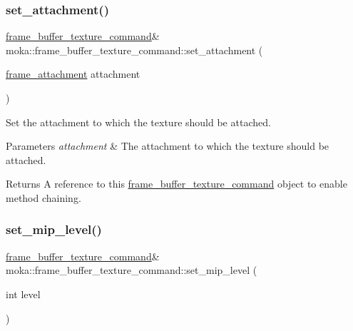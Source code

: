 \mbox{\label{classmoka_1_1frame__buffer__texture__command_a6ae9bc7d6a29e0dac6bd13b69d5b6b5e}} 
\subsubsection{\texorpdfstring{set\_attachment()}{set\_attachment()}}
{\footnotesize\ttfamily \mbox{\hyperlink{classmoka_1_1frame__buffer__texture__command}{frame\+\_\+buffer\+\_\+texture\+\_\+command}}\& moka\+::frame\+\_\+buffer\+\_\+texture\+\_\+command\+::set\+\_\+attachment (\begin{DoxyParamCaption}\item[{\mbox{\hyperlink{namespacemoka_a0a44ecbb877dec1107d9915dc95c58d1}{frame\+\_\+attachment}}}]{attachment }\end{DoxyParamCaption})}



Set the attachment to which the texture should be attached. 


\begin{DoxyParams}{Parameters}
{\em attachment} & The attachment to which the texture should be attached. \\
\hline
\end{DoxyParams}
\begin{DoxyReturn}{Returns}
A reference to this \mbox{\hyperlink{classmoka_1_1frame__buffer__texture__command}{frame\+\_\+buffer\+\_\+texture\+\_\+command}} object to enable method chaining. 
\end{DoxyReturn}
\mbox{\label{classmoka_1_1frame__buffer__texture__command_a37bd0d4d87f2d86813f34a7fc68e8768}} 
\subsubsection{\texorpdfstring{set\_mip\_level()}{set\_mip\_level()}}
{\footnotesize\ttfamily \mbox{\hyperlink{classmoka_1_1frame__buffer__texture__command}{frame\+\_\+buffer\+\_\+texture\+\_\+command}}\& moka\+::frame\+\_\+buffer\+\_\+texture\+\_\+command\+::set\+\_\+mip\+\_\+level (\begin{DoxyParamCaption}\item[{int}]{level }\end{DoxyParamCaption})}



